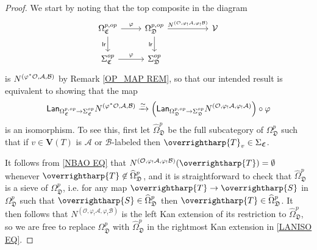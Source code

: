 \documentclass[a4paper,10pt
,draft
]{article}%
\numberwithin{equation}{section}
\numberwithin{figure}{section}
\theoremstyle{definition} %
\newcommand{\vect}[1]{\text{\overrightharp{\ensuremath{#1}}}}
\newcommand{\1}{\ensuremath{\mathbbm 1}}%
\begin{document}
\begin{proof}%

We start by noting that the top composite in the diagram
\[
\begin{tikzcd}
	\Omega_{\mathfrak{C}}^{p,op} \ar{r}{\varphi} \ar{d}[swap]{\mathsf{lr}} &
	\Omega_{\mathfrak{D}}^{p,op} 
	\ar{rr}{N^{(\mathcal{O},\varphi_!\mathcal{A},\varphi_!\mathcal{B})}}
	\ar{d}[swap]{\mathsf{lr}} &&
	\mathcal{V}
\\
	\Sigma_{\mathfrak{C}}^{op} \ar{r}{\varphi} &
	\Sigma_{\mathfrak{D}}^{op} 
\end{tikzcd}
\]
is $N^{(\varphi^{\**}\mathcal{O},\mathcal{A},\mathcal{B})}$
by Remark \ref{OP_MAP REM}, 
so that our intended result is equivalent to showing that the map
\begin{equation}\label{LANISO EQ}
	\mathsf{Lan}_{\Omega_{\mathfrak{C}}^{p,op} \to \Sigma_{\mathfrak{C}}^{op}}
	N^{(\varphi^{\**}\mathcal{O},\mathcal{A},\mathcal{B})}
\xrightarrow{\simeq}
\left(
	\mathsf{Lan}_{\Omega_{\mathfrak{D}}^{p,op} \to \Sigma_{\mathfrak{D}}^{op}}
	N^{(\mathcal{O},\varphi_!\mathcal{A},\varphi_!\mathcal{A})}
\right) \circ \varphi 
\end{equation}
is an isomorphism.
%
To see this, first let $\widehat{\Omega}^p_{\mathfrak{D}}$
be the full subcategory of $\Omega^p_{\mathfrak{D}}$
such that if 
$v \in \boldsymbol{V}(T)$ is 
$\mathcal{A}$ or $\mathcal{B}$-labeled then 
$\vect{T}_v \in \Sigma_{\mathfrak C}$.



It follows from \eqref{NBAO EQ} that 
$N^{(\mathcal{O}, \varphi_! \mathcal{A}, \varphi_! \mathcal{B})}(\vect{T}) =
 \emptyset$ whenever $\vect{T} \not \in \widehat{\Omega}^p_{\mathfrak{D}}$,
and it is straightforward to check that 
$\widehat{\Omega}^p_{\mathfrak{D}}$
is a sieve of $\Omega^p_{\mathfrak{D}}$, 
i.e. for any map $\vect{T} \to \vect{S}$ 
in $\Omega^p_{\mathfrak{D}}$ such that 
$\vect{S} \in \widehat{\Omega}^p_{\mathfrak{D}}$ then 
$\vect{T} \in \widehat{\Omega}^p_{\mathfrak{D}}$.
It then follows that 
$N^{(\mathcal{O}, \varphi_! \mathcal{A}, \varphi_! \mathcal{B})}$
is the left Kan extension of its restriction to 
$\widehat{\Omega}^p_{\mathfrak{D}}$, 
so we are free to replace
$\Omega^p_{\mathfrak{D}}$
with
$\widehat{\Omega}^p_{\mathfrak{D}}$
in the rightmost Kan extension in \eqref{LANISO EQ}.




\end{proof}
\end{document}
